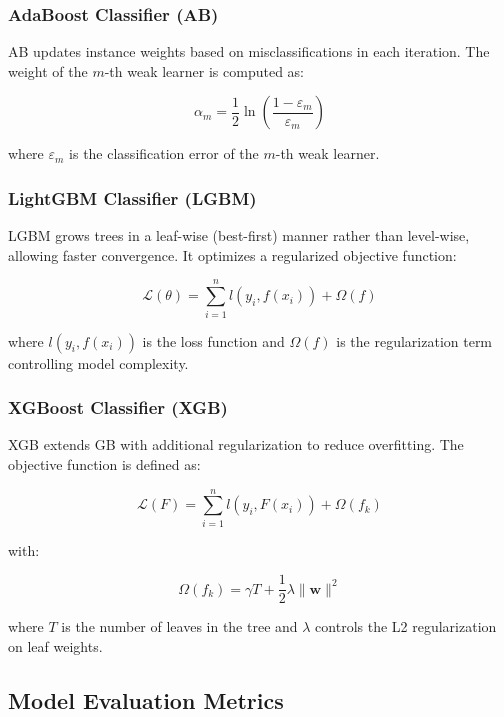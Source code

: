 \documentclass[conference]{IEEEtran}
\begin{document}
\subsubsection{\textbf{AdaBoost Classifier (AB)}}
AB updates instance weights based on misclassifications in each iteration. The weight of the $m$-th weak learner is computed as:

\begin{equation}
\alpha_m = \frac{1}{2} \ln\left(\frac{1 - \varepsilon_m}{\varepsilon_m}\right)
\end{equation}

where $\varepsilon_m$ is the classification error of the $m$-th weak learner.

\subsubsection{\textbf{LightGBM Classifier (LGBM)}}
LGBM grows trees in a leaf-wise (best-first) manner rather than level-wise, allowing faster convergence. It optimizes a regularized objective function:

\begin{equation}
\mathcal{L}(\theta) = \sum_{i=1}^{n} l(y_i, f(x_i)) + \Omega(f)
\end{equation}

where $l(y_i, f(x_i))$ is the loss function and $\Omega(f)$ is the regularization term controlling model complexity.

\subsubsection{\textbf{XGBoost Classifier (XGB)}}
XGB extends GB with additional regularization to reduce overfitting. The objective function is defined as:

\begin{equation}
\mathcal{L}(F) = \sum_{i=1}^{n} l(y_i, F(x_i)) + \Omega(f_k)
\end{equation}

with:

\begin{equation}
\Omega(f_k) = \gamma T + \frac{1}{2} \lambda \|\mathbf{w}\|^2
\end{equation}

where $T$ is the number of leaves in the tree and $\lambda$ controls the L2 regularization on leaf weights.






\subsection{\textbf{Model Evaluation Metrics}}
\end{document}
